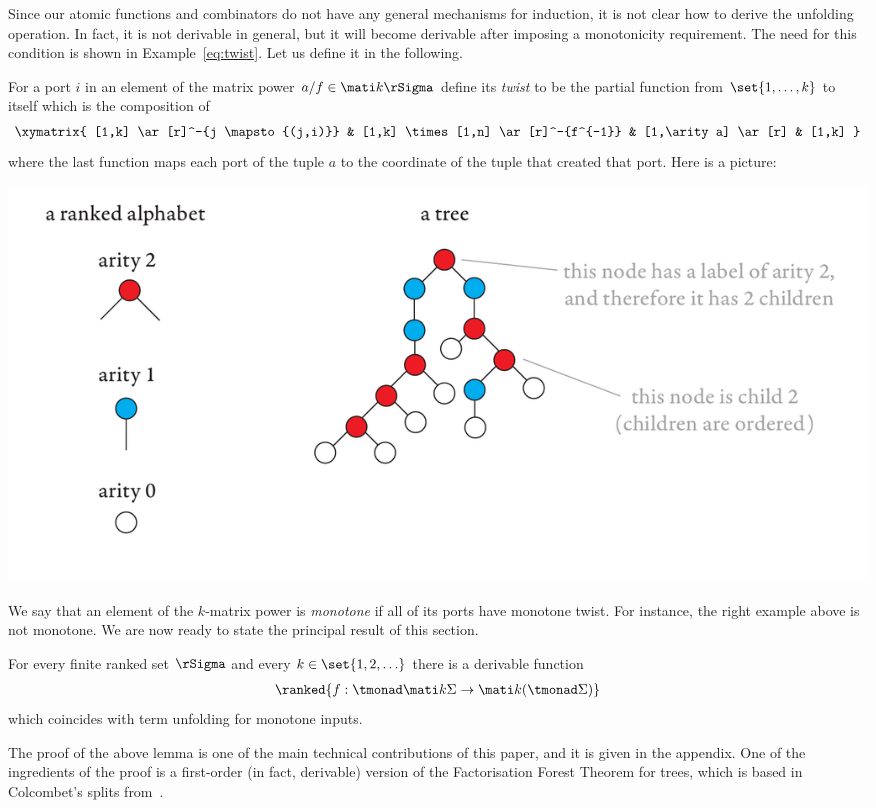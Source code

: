 Since our atomic functions and combinators do not have any general mechanisms for induction, it is not clear how to derive the unfolding operation. In fact, it is not derivable in general, but it will become derivable after imposing a monotonicity requirement. The need for this condition is shown in Example~\ref{eq:twist}.  Let us define it in the following.

For a port $i$ in an element of the matrix power $a/f \in \mati k \rSigma$ define its \emph{twist} to be the partial function from $\set{1,\ldots,k}$ to itself 
which is the composition of 
\begin{align*}
\xymatrix{
    [1,k] \ar[r]^-{j \mapsto {(j,i)}} & [1,k] \times [1,n] \ar[r]^-{f^{-1}} & [1,\arity a] \ar[r] & [1,k]
}
\end{align*}
where the last function maps each port of the tuple $a$ to the coordinate of the tuple that created that port. Here is a picture:
\begin{center}
\includegraphics[scale=.3, page=87]{pics.pdf}
\end{center}
 We say that an element of the $k$-matrix power is \emph{monotone} if all of its ports have monotone twist. For instance, the right example above is not monotone.
 We are now ready to state the principal result of this section.

\begin{proposition}\label{prop:monotone-unfold}
    For every finite ranked set $\rSigma$ and every $k \in \set{1,2,\ldots}$ there is a derivable function 
    \begin{align*}
    \ranked{ f : \tmonad \mati k \Sigma \to \mati k {(\tmonad \Sigma)}}
    \end{align*}
    which coincides with term unfolding for monotone inputs.
\end{proposition}
The proof of the  above lemma is one of the main technical contributions of this paper, and it is given in the appendix. One of the ingredients of the proof is a first-order (in fact, derivable) version of the Factorisation Forest Theorem for trees, which is based in Colcombet's splits from~\cite{colcombetCombinatorialTheoremTrees2007}.  


